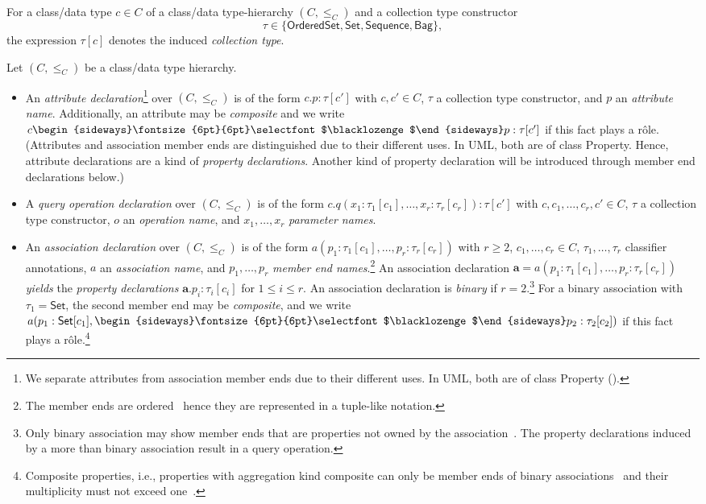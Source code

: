 \documentclass[10pt, a4paper]{isov2}
\newcommand{\uml}[1]{\textsf{#1}}
\newcommand{\composition}{\raisebox{0.2pt}{\begin{sideways}\fontsize{6pt}{6pt}\selectfont$\blacklozenge$\end{sideways}}}
\begin{document}
For a class/data type $c \in C$ of a class/data type-hierarchy
$(C, {\leq_C})$ and a collection type constructor
%
\begin{equation*}
  \tau \in \{ \mathsf{OrderedSet}, \mathsf{Set}, \mathsf{Sequence},
\mathsf{Bag} \},
\end{equation*}
%
the expression $\tau[c]$ denotes the induced \emph{collection type}.

Let $(C, {\leq_C})$ be a class/data type hierarchy.
%
\begin{itemize}[label={--}, leftmargin=*]
  \item An \emph{attribute declaration}\footnote{We separate attributes
 from association member ends due to their different uses.  In UML,
 both are of class \uml{Property} (\cite[p.~109]{uml-2.5}).} over $(C, {\leq_C})$ is of the form
$c.p : \tau[c']$ with $c, c' \in C$, $\tau$ a collection type
constructor, and $p$ an \emph{attribute name}. Additionally, an attribute may be \emph{composite} and we write
$c\composition p : \tau[c']$ if this fact plays a rôle. (Attributes
  and association member ends are distinguished due to their different uses.  In UML,
  both are of class \uml{Property}. Hence, attribute 
declarations are a kind of \emph{property declarations}. Another
kind of property declaration will be introduced through member end
declarations below.) 

  \item A \emph{query operation declaration} over $(C, {\leq_C})$ is of
the form $c.q(x_1 : \tau_1[c_1], \dots, x_r : \tau_r[c_r]) : \tau[c']$
with $c, c_1,\ldots, c_r, c' \in C$, $\tau$ a collection type
constructor, $o$ an \emph{operation name}, and $x_1, \ldots, x_r$
\emph{parameter names}.

  \item An \emph{association declaration} over $(C, {\leq_C})$
is of the form $a(p_1 : \tau_1[c_1], \dots, p_r : \tau_r[c_r])$
with $r \geq 2$,
$c_1, \dots, c_r \in C$,
$\tau_1, \ldots, \tau_r$
classifier annotations, $a$
an \emph{association name}, and $p_1, \dots, p_r$
\emph{member end names}.\footnote{The member ends are
  ordered~\cite[p.~197]{uml-2.5} hence they are represented in a
  tuple-like notation.}  An association declaration
$\mathbf{a} = a(p_1 : \tau_1[c_1], \ldots, p_r : \tau_r[c_r])$
\emph{yields} the \emph{property declarations}
$\mathbf{a}.p_i : \tau_i[c_i]$
for $1 \leq i \leq r$.
An association declaration is \emph{binary} if $r = 2$.\footnote{Only
  binary association may show member ends that are properties not owned
  by the association~\cite[p.~218]{uml-2.5}.  The property declarations
  induced by a more than binary association result in a query
  operation.}  For a binary association with $\tau_1 = \mathsf{Set}$,
the second member end may be \emph{composite}, and we write
$a(p_1 : \mathsf{Set}[c_1], \composition p_2 : \tau_2[c_2])$
if this fact plays a rôle.\footnote{Composite properties, i.e.,
  properties with aggregation kind \uml{composite} can only be member
  ends of binary associations~\cite[p.~218]{uml-2.5} and their
  multiplicity must not exceed one~\cite[p.~150]{uml-2.5}.}
\end{itemize}
\end{document}
